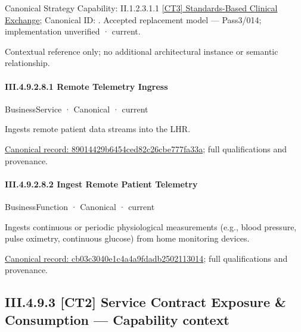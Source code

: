 {\small Canonical Strategy Capability: II.1.2.3.1.1 \hyperref[element:319398b3f4b54bac85b61cb5ecd392b1]{[CT3] Standards-Based Clinical Exchange}; Canonical ID: \texttt{}. Accepted replacement model — Pass3/014; implementation unverified · current.}\par
Contextual reference only; no additional architectural instance or semantic relationship.\par
\paragraph*{III.4.9.2.8.1 Remote Telemetry Ingress}
\label{navigation:III.4.9.2.8.1}

\label{element:89014429b6454ced82c26cbe777fa33a}
{\small BusinessService · Canonical · current}\par

Ingests remote patient data streams into the LHR.


{\footnotesize \href{../../../../../../../../continuum/business/business-service/89014429b6454ced82c26cbe777fa33a.md}{Canonical record: 89014429b6454ced82c26cbe777fa33a}; full qualifications and provenance.}\par
\paragraph*{III.4.9.2.8.2 Ingest Remote Patient Telemetry}
\label{navigation:III.4.9.2.8.2}

\label{element:cb03c3040e1c4a4a9fdadb2502113014}
{\small BusinessFunction · Canonical · current}\par

Ingests continuous or periodic physiological measurements (e.g., blood pressure, pulse oximetry, continuous glucose) from home monitoring devices.


{\footnotesize \href{../../../../../../../../continuum/business/business-function/cb03c3040e1c4a4a9fdadb2502113014.md}{Canonical record: cb03c3040e1c4a4a9fdadb2502113014}; full qualifications and provenance.}\par
\subsection*{III.4.9.3 [CT2] Service Contract Exposure \& Consumption — Capability context}
\label{navigation:III.4.9.3}

